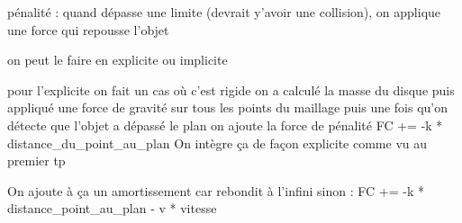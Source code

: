 \documentclass[a4paper]{article}
\begin{document}
pénalité : quand dépasse une limite (devrait y'avoir une collision), on applique une force qui repousse l'objet

on peut le faire en explicite ou implicite

pour l'explicite on fait un cas où c'est rigide
on a calculé la masse du disque puis appliqué une force de gravité sur tous les points du maillage
puis une fois qu'on détecte que l'objet a dépassé le plan on ajoute la force de pénalité FC += -k * distance_du_point_au_plan
On intègre ça de façon explicite comme vu au premier tp

On ajoute à ça un amortissement car rebondit à l'infini sinon : FC += -k * distance_point_au_plan - v * vitesse

\end{document}
